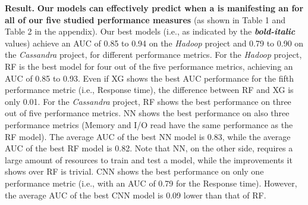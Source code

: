 \noindent \textbf{Result.}
\noindent \textbf{Our models can effectively predict when a \instance is manifesting an \inconsistent for all of our five studied performance measures} (as shown in Table 1 %
and Table 2 %
in the appendix). %
Our best models (i.e., as indicated by the \textbf{\textit{bold-italic}} values) achieve an AUC of 0.85 to 0.94 on the \emph{Hadoop} project and 0.79 to 0.90 on the \emph{Cassandra} project, for different performance metrics.
For the \emph{Hadoop} project, %
RF is the best model for four out of the five performance metrics, achieving an AUC of 0.85 to 0.93. Even if XG shows the best AUC performance for the fifth performance metric (i.e., Response time), the difference between RF and XG is only 0.01. 
For the \emph{Cassandra} project, RF shows the best performance on three out of five performance metrics. NN shows the best performance on also three performance metrics (Memory and I/O read have the same performance as the RF model). The average AUC of the best NN model is 0.83, while the average AUC of the best RF model is 0.82. 
Note that %
NN, on the other side, requires a large amount of resources to train and test a model, while the improvements it shows over RF is trivial.
CNN shows the best performance on only one performance metric (i.e., with an AUC of 0.79 for the Response time). However, the average AUC of the best CNN model is 0.09 lower than that of RF. 
